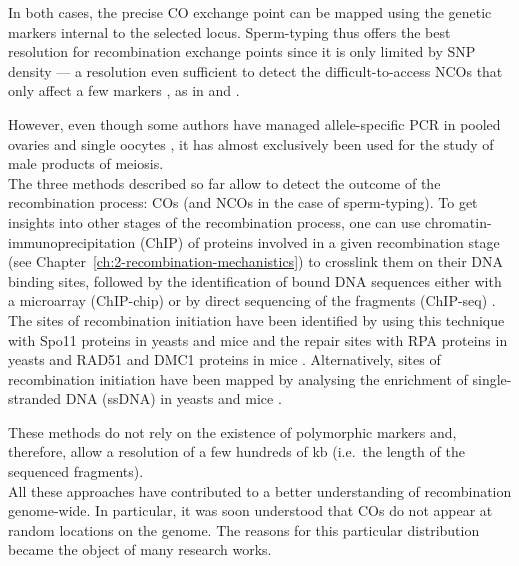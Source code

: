 In both cases, the precise CO exchange point can be mapped using the genetic markers internal to the selected locus.
Sperm-typing thus offers the best resolution for recombination exchange points since it is only limited by SNP density — a resolution even sufficient to detect the difficult-to-access NCOs that only affect a few markers \citep{hellenthal2006insights}, as in \citet{tusie-luna1995gene} and \citet{guillon2002initiation}.

However, even though some authors have managed allele-specific PCR in pooled ovaries \citep{guillon2005crossover, baudat2007cis} and single oocytes \citep{cole2014mouse}, it has almost exclusively been used for the study of male products of meiosis.\\

The three methods described so far allow to detect the outcome of the recombination process: COs (and NCOs in the case of sperm-typing).
To get insights into other stages of the recombination process, one can use chromatin-immunoprecipitation (ChIP) of proteins involved in a given recombination stage (see Chapter~\ref{ch:2-recombination-mechanistics}) to crosslink them on their DNA binding sites, followed by the identification of bound DNA sequences either with a microarray (ChIP-chip) or by direct sequencing of the fragments (ChIP-seq) \citep[reviewed in][]{park2009chipseq}. 
The sites of recombination initiation have been identified by using this technique with Spo11 proteins in yeasts \citep{gerton2000global,mieczkowski2007loss,pan2011hierarchical} and mice \citep{lange2016landscape} and the repair sites with RPA proteins in yeasts \citep{borde2009histone} and RAD51 and DMC1 proteins in mice \citep{smagulova2011genomewide,brick2012genetic}.
Alternatively, sites of recombination initiation have been mapped by analysing the enrichment of single-stranded DNA (ssDNA) in yeasts \citep{blitzblau2007mapping,buhler2007mapping} and mice \citep{khil2012sensitive}.

These methods do not rely on the existence of polymorphic markers and, therefore, allow a resolution of a few hundreds of kb (i.e.\ the length of the sequenced fragments).\\


All these approaches have contributed to a better understanding of recombination genome-wide.
In particular, it was soon understood that COs do not appear at random locations on the genome.
The reasons for this particular distribution became the object of many research works.




